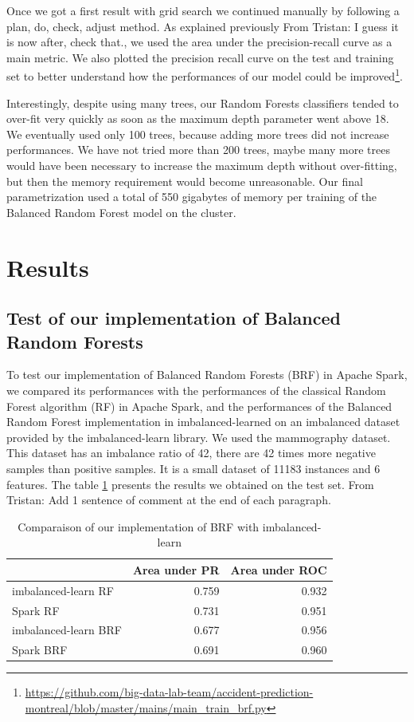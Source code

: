 \documentclass[conference]{IEEEtran}
\newcommand{\TG}[1]{\colorlet{saved}{.}\color{orange}From Tristan: #1\color{saved}}
\begin{document}
Once we got a first result with grid search we continued manually by
following a plan, do, check, adjust method. As explained previously \TG{I guess it is now after, check that.}, we used the area under the precision-recall curve as a main metric. We also plotted the precision recall curve on the test and training set to better understand how the performances of our model could be improved\footnote{\url{https://github.com/big-data-lab-team/accident-prediction-montreal/blob/master/mains/main\_train\_brf.py}}.

Interestingly, despite using many trees, our Random Forests classifiers
tended to over-fit very quickly as soon as the maximum depth parameter went
above 18. We eventually used only 100 trees, because adding more trees did
not increase performances. We have not tried more than 200 trees, maybe
many more trees would have been necessary to increase the maximum depth
without over-fitting, but then the memory requirement would become unreasonable.
Our final parametrization used a total of 550 gigabytes of memory per training of the Balanced Random Forest model on the cluster.

\section{Results}

\subsection{Test of our implementation of Balanced Random Forests}
To test our implementation of Balanced Random Forests (BRF) in Apache Spark, we compared its performances with the performances of the classical Random Forest algorithm (RF) in Apache Spark, and the performances of the Balanced Random Forest implementation in 
imbalanced-learned\cite{imbalance} on an imbalanced dataset provided by the imbalanced-learn library. We used the mammography dataset. This dataset has an imbalance ratio of 42, there are 42 times more negative samples than positive samples. It is a small dataset of 11183 instances and 6 features. The table \ref{table:test_brf_results} presents the results we obtained on the test set. \TG{Add 1 sentence of comment at the end of each paragraph.}

\begin{table}[htbp]
\caption{Comparaison of our implementation of BRF with imbalanced-learn}
\begin{center}
\begin{tabular}{|l|r|r|}
\hline
{} &  Area under PR &  Area under ROC \\
\hline
imbalanced-learn RF  &          0.759 &           0.932 \\
Spark RF             &          0.731 &           0.951 \\
imbalanced-learn BRF &          0.677 &           0.956 \\
Spark BRF            &          0.691 &           0.960 \\
\hline
\end{tabular}
\label{table:test_brf_results}
\end{center}
\end{table}
\end{document}
